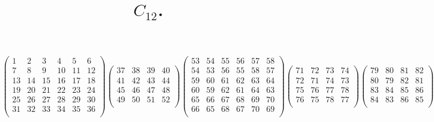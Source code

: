 \documentclass[12pt,a4paper,landscape]{amsart}
\title{$C_{12}$.}
\begin{document}
\maketitle

\begin{align*}
\left(\begin{array}{r|r|r|r|r|r}%
1&2&3&4&5&6\\%
\hline
7&8&9&10&11&12\\%
\hline
13&14&15&16&17&18\\%
\hline
19&20&21&22&23&24\\%
\hline
25&26&27&28&29&30\\%
\hline
31&32&33&34&35&36\\%
\end{array}\right)%
\left(\begin{array}{r|r|r|r}%
37&38&39&40\\%
\hline
41&42&43&44\\%
\hline
45&46&47&48\\%
\hline
49&50&51&52\\%
\end{array}\right)%
\left(\begin{array}{rr|rr|rr}%
53&54&55&56&57&58\\%
54&53&56&55&58&57\\%
\hline
59&60&61&62&63&64\\%
60&59&62&61&64&63\\%
\hline
65&66&67&68&69&70\\%
66&65&68&67&70&69\\%
\end{array}\right)%
\left(\begin{array}{rr|rr}%
71&72&73&74\\%
72&71&74&73\\%
\hline
75&76&77&78\\%
76&75&78&77\\%
\end{array}\right)%
\left(\begin{array}{rr|rr}%
79&80&81&82\\%
80&79&82&81\\%
\hline
83&84&85&86\\%
84&83&86&85\\%
\end{array}\right)%
\left(\begin{array}{rrrr}%
87&88&89&90\\%
88&87&90&89\\%
89&90&87&88\\%
90&89&88&87\\%
\end{array}\right)%
\end{align*}
\end{document}
